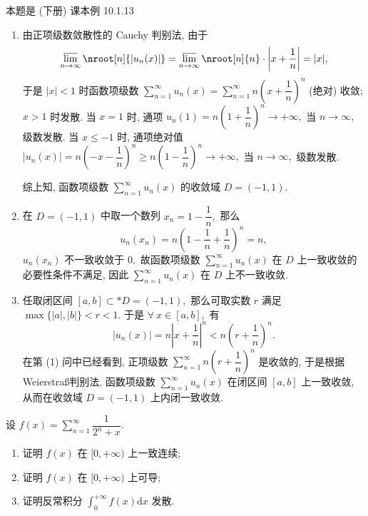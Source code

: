 \begin{solution}
本题是 (下册) 课本例 10.1.13

\begin{enumerate}
\item 由正项级数敛散性的 Cauchy 判别法, 由于
\[\varlimsup_{n\to\infty} \nroot[n]{\lvert u_n(x) \rvert} = \varlimsup_{n\to\infty} \nroot[n]{n} \cdot \left\lvert x + \dfrac{1}{n} \right\rvert = \lvert x \rvert,\]
于是 $\lvert x \rvert < 1$ 时函数项级数 $\sum\limits_{n=1}^{\infty} u_n(x) = \sum\limits_{n=1}^{\infty} n \left( x + \dfrac{1}{n} \right)^n$ (绝对) 收敛; $x > 1$ 时发散. 当 $x = 1$ 时, 通项 $u_n(1) = n \left( 1 + \dfrac{1}{n} \right)^n \to +\infty,$ 当 $n \to \infty,$ 级数发散. 当 $x \leqslant -1$ 时, 通项绝对值 $\lvert u_n(x) \rvert = n \left( -x - \dfrac{1}{n} \right)^n \geqslant n \left( 1 - \dfrac{1}{n} \right)^n \to +\infty,$ 当 $n \to \infty,$ 级数发散.

综上知, 函数项级数 $\sum\limits_{n=1}^{\infty} u_n(x)$ 的收敛域 $D = (-1, 1).$
\item 在 $D = (-1, 1)$ 中取一个数列 $x_n = 1 - \dfrac{1}{n},$ 那么
\[u_n(x_n) = n \left( 1 - \dfrac{1}{n} + \dfrac{1}{n} \right)^n = n,\]
$u_n(x_n)$ 不一致收敛于 $0,$ 故函数项级数 $\sum\limits_{n=1}^{\infty} u_n(x)$ 在 $D$ 上一致收敛的必要性条件不满足, 因此 $\sum\limits_{n=1}^{\infty} u_n(x)$ 在 $D$ 上不一致收敛.
\item 任取闭区间 $[a, b] \subset* D = (-1, 1),$ 那么可取实数 $r$ 满足 $\max\{\lvert a \rvert, \lvert b \rvert\} < r < 1.$ 于是 $\forall ~ x \in [a, b],$ 有
\[\lvert u_n(x) \rvert = n \left\lvert x + \dfrac{1}{n} \right\rvert^n < n \left( r + \dfrac{1}{n} \right)^n.\]
在第 (1) 问中已经看到, 正项级数 $\sum\limits_{n=1}^{\infty} n \left( r + \dfrac{1}{n} \right)^n$ 是收敛的, 于是根据 Weierstra\ss 判别法, 函数项级数 $\sum\limits_{n=1}^{\infty} u_n(x)$ 在闭区间 $[a, b]$ 上一致收敛, 从而在收敛域 $D = (-1, 1)$ 上内闭一致收敛.
\end{enumerate}
\end{solution}

\begin{question}[points = 10]
设 $f(x) = \sum\limits_{n=1}^\infty \dfrac{1}{2^n + x}.$
\begin{enumerate}
\item 证明 $f(x)$ 在 $[0, +\infty)$ 上一致连续;
\item 证明 $f(x)$ 在 $[0, +\infty)$ 上可导;
\item 证明反常积分 $\int_0^{+\infty} f(x) \mathrm{d} x$ 发散.
\end{enumerate}

\end{question}

